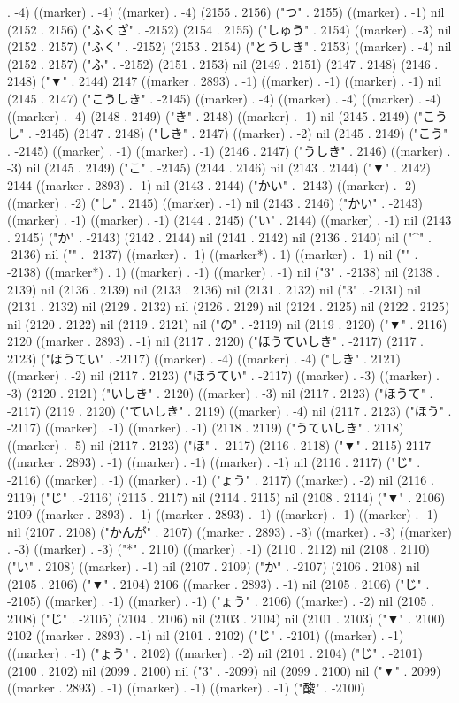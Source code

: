 . -4) ((marker) . -4) ((marker) . -4) (2155 . 2156) ("つ" . 2155) ((marker) . -1) nil (2152 . 2156) ("ふくざ" . -2152) (2154 . 2155) ("しゅう" . 2154) ((marker) . -3) nil (2152 . 2157) ("ふく" . -2152) (2153 . 2154) ("とうしき" . 2153) ((marker) . -4) nil (2152 . 2157) ("ふ" . -2152) (2151 . 2153) nil (2149 . 2151) (2147 . 2148) (2146 . 2148) ("▼" . 2144) 2147 ((marker . 2893) . -1) ((marker) . -1) ((marker) . -1) nil (2145 . 2147) ("こうしき" . -2145) ((marker) . -4) ((marker) . -4) ((marker) . -4) ((marker) . -4) (2148 . 2149) ("き" . 2148) ((marker) . -1) nil (2145 . 2149) ("こうし" . -2145) (2147 . 2148) ("しき" . 2147) ((marker) . -2) nil (2145 . 2149) ("こう" . -2145) ((marker) . -1) ((marker) . -1) (2146 . 2147) ("うしき" . 2146) ((marker) . -3) nil (2145 . 2149) ("こ" . -2145) (2144 . 2146) nil (2143 . 2144) ("▼" . 2142) 2144 ((marker . 2893) . -1) nil (2143 . 2144) ("かい" . -2143) ((marker) . -2) ((marker) . -2) ("し" . 2145) ((marker) . -1) nil (2143 . 2146) ("かい" . -2143) ((marker) . -1) ((marker) . -1) (2144 . 2145) ("い" . 2144) ((marker) . -1) nil (2143 . 2145) ("か" . -2143) (2142 . 2144) nil (2141 . 2142) nil (2136 . 2140) nil ("^" . -2136) nil ("{" . -2137) ((marker) . -1) ((marker*) . 1) ((marker) . -1) nil ("}" . -2138) ((marker*) . 1) ((marker) . -1) ((marker) . -1) nil ("3" . -2138) nil (2138 . 2139) nil (2136 . 2139) nil (2133 . 2136) nil (2131 . 2132) nil ("3" . -2131) nil (2131 . 2132) nil (2129 . 2132) nil (2126 . 2129) nil (2124 . 2125) nil (2122 . 2125) nil (2120 . 2122) nil (2119 . 2121) nil ("の" . -2119) nil (2119 . 2120) ("▼" . 2116) 2120 ((marker . 2893) . -1) nil (2117 . 2120) ("ほうていしき" . -2117) (2117 . 2123) ("ほうてい" . -2117) ((marker) . -4) ((marker) . -4) ("しき" . 2121) ((marker) . -2) nil (2117 . 2123) ("ほうてい" . -2117) ((marker) . -3) ((marker) . -3) (2120 . 2121) ("いしき" . 2120) ((marker) . -3) nil (2117 . 2123) ("ほうて" . -2117) (2119 . 2120) ("ていしき" . 2119) ((marker) . -4) nil (2117 . 2123) ("ほう" . -2117) ((marker) . -1) ((marker) . -1) (2118 . 2119) ("うていしき" . 2118) ((marker) . -5) nil (2117 . 2123) ("ほ" . -2117) (2116 . 2118) ("▼" . 2115) 2117 ((marker . 2893) . -1) ((marker) . -1) ((marker) . -1) nil (2116 . 2117) ("じ" . -2116) ((marker) . -1) ((marker) . -1) ("ょう" . 2117) ((marker) . -2) nil (2116 . 2119) ("じ" . -2116) (2115 . 2117) nil (2114 . 2115) nil (2108 . 2114) ("▼" . 2106) 2109 ((marker . 2893) . -1) ((marker . 2893) . -1) ((marker) . -1) ((marker) . -1) nil (2107 . 2108) ("かんが" . 2107) ((marker . 2893) . -3) ((marker) . -3) ((marker) . -3) ((marker) . -3) ("*" . 2110) ((marker) . -1) (2110 . 2112) nil (2108 . 2110) ("い" . 2108) ((marker) . -1) nil (2107 . 2109) ("か" . -2107) (2106 . 2108) nil (2105 . 2106) ("▼" . 2104) 2106 ((marker . 2893) . -1) nil (2105 . 2106) ("じ" . -2105) ((marker) . -1) ((marker) . -1) ("ょう" . 2106) ((marker) . -2) nil (2105 . 2108) ("じ" . -2105) (2104 . 2106) nil (2103 . 2104) nil (2101 . 2103) ("▼" . 2100) 2102 ((marker . 2893) . -1) nil (2101 . 2102) ("じ" . -2101) ((marker) . -1) ((marker) . -1) ("ょう" . 2102) ((marker) . -2) nil (2101 . 2104) ("じ" . -2101) (2100 . 2102) nil (2099 . 2100) nil ("3" . -2099) nil (2099 . 2100) nil ("▼" . 2099) ((marker . 2893) . -1) ((marker) . -1) ((marker) . -1) ("酸" . -2100) 